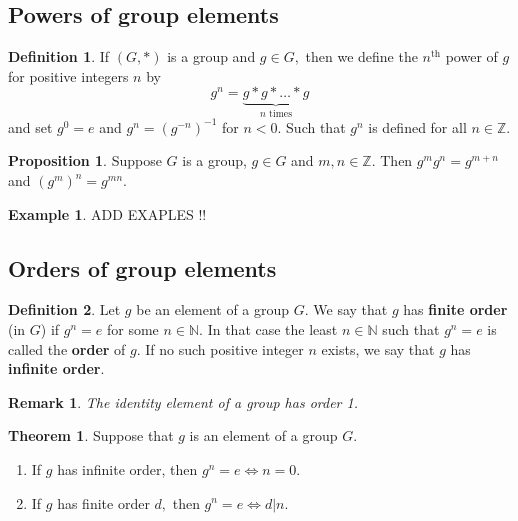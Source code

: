 \documentclass[12pt, a4paper]{article}
\newcommand{\bb}[1]{\mathbb{#1}}
\newtheorem*{remark}{Remark}
\theoremstyle{definition}
\newtheorem{definition}{Definition}[section]
\newtheorem{theorem}{Theorem}[section]
\newtheorem*{example}{Example}
\newtheorem{proposition}{Proposition}
\theoremstyle{plain}
\begin{document}
\subsection{Powers of group elements}

\begin{definition}
If $(G, *)$ is a group and $g \in G,$ then we define the $n^{\text{th}}$ power of $g$ for positive integers $n$ by 
$$g^n=\underbrace{g*g*\ldots*g}_{n \text{ times}}$$
and set $g^0=e$ and $g^n=\left(g^{-n}\right)^{-1}$ for $n<0.$ Such that $g^n$ is defined for all $n\in \bb{Z}.$
\end{definition}

\begin{proposition}
Suppose $G$ is a group, $g \in G$ and $m,n \in \bb{Z}.$ Then $g^mg^n = g^{m+n}$ and $(g^m)^n = g^{mn}.$
\end{proposition}

\begin{example}
ADD EXAPLES !!
\end{example}

\subsection{Orders of group elements}

\begin{definition}
Let $g$ be an element of a group $G.$ We say that $g$ has \textbf{finite order} (in $G$) if $g^n =e$ for some $n \in \bb{N}.$ In that case the least $n\in \bb{N}$ such that $g^n = e$ is called the \textbf{order} of $g.$ If no such positive integer $n$ exists, we say that $g$ has \textbf{infinite order}.
\end{definition}

\begin{remark}
The identity element of a group has order 1.
\end{remark}

\begin{theorem}
Suppose that $g$ is an element of a group $G.$
\begin{enumerate}
	
	\item If $g$ has infinite order, then $g^n =e \iff n=0.$

	\item If $g$ has finite order $d,$ then $g^n =e \iff d|n.$

\end{enumerate}
\end{theorem}
\end{document}
